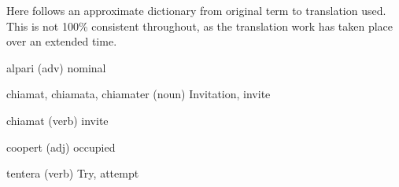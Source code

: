 \newpage
{}

Here follows an approximate dictionary from original term to translation used. This is not 100\% consistent throughout, as the translation work has taken place over an extended time.

\begin{description}
\item{alpari} (adv) nominal
\item{chiamat, chiamata, chiamater} (noun) Invitation, invite
\item{chiamat} (verb) invite
\item{coopert} (adj) occupied
\item{tentera} (verb) Try, attempt
\end{description}